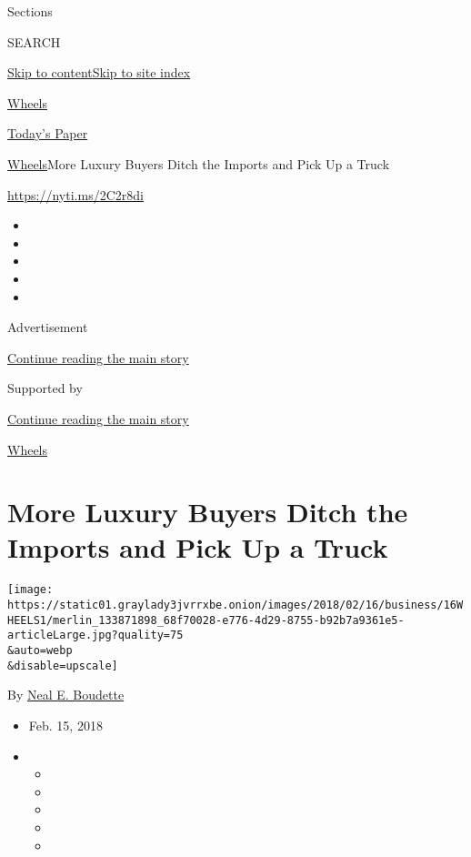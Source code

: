 Sections

SEARCH

\protect\hyperlink{site-content}{Skip to
content}\protect\hyperlink{site-index}{Skip to site index}

\href{https://www.nytimes3xbfgragh.onion/pages/automobiles/wheels/index.html}{Wheels}

\href{https://myaccount.nytimes3xbfgragh.onion/auth/login?response_type=cookie\&client_id=vi}{}

\href{https://www.nytimes3xbfgragh.onion/section/todayspaper}{Today's
Paper}

\href{/pages/automobiles/wheels/index.html}{Wheels}\textbar{}More Luxury
Buyers Ditch the Imports and Pick Up a Truck

\url{https://nyti.ms/2C2r8di}

\begin{itemize}
\item
\item
\item
\item
\item
\end{itemize}

Advertisement

\protect\hyperlink{after-top}{Continue reading the main story}

Supported by

\protect\hyperlink{after-sponsor}{Continue reading the main story}

\href{/column/wheels}{Wheels}

\hypertarget{more-luxury-buyers-ditch-the-imports-and-pick-up-a-truck}{%
\section{More Luxury Buyers Ditch the Imports and Pick Up a
Truck}\label{more-luxury-buyers-ditch-the-imports-and-pick-up-a-truck}}

\texttt{[image: https://static01.graylady3jvrrxbe.onion/images/2018/02/16/business/16WHEELS1/merlin\_133871898\_68f70028-e776-4d29-8755-b92b7a9361e5-articleLarge.jpg?quality=75\\\&auto=webp\\\&disable=upscale]}

By \href{https://www.nytimes3xbfgragh.onion/by/neal-e-boudette}{Neal E.
Boudette}

\begin{itemize}
\item
  Feb. 15, 2018
\item
  \begin{itemize}
  \item
  \item
  \item
  \item
  \item
  \end{itemize}
\end{itemize}

